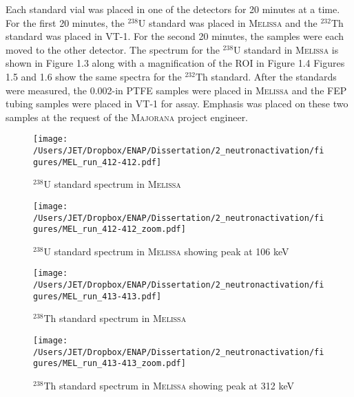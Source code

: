 Each standard vial was placed in one of the detectors for 20 minutes at a time.  For the first 20 minutes, the $^{238}$U standard was placed in \textsc{Melissa} and the $^{232}$Th standard was placed in VT-1.  For the second 20 minutes, the samples were each moved to the other detector.  The spectrum for the $^{238}$U standard in \textsc{Melissa} is shown in Figure 1.3 along with a magnification of the ROI in Figure 1.4  Figures 1.5 and 1.6 show the same spectra for the $^{232}$Th standard.  After the standards were measured, the 0.002-in PTFE samples were placed in \textsc{Melissa} and the FEP tubing samples were placed in VT-1 for assay.  Emphasis was placed on these two samples at the request of the \textsc{Majorana} project engineer.  

\begin{figure}[htbp]
\centering
\texttt{[image: /Users/JET/Dropbox/ENAP/Dissertation/2\_neutronactivation/figures/MEL\_run\_412-412.pdf]}
\caption[%
$^{238}$U standard spectrum in \textsc{Melissa}
]{%
$^{238}$U standard spectrum in \textsc{Melissa}
\label{fig:mjd_cryostat}} 
\end{figure}

\begin{figure}[htbp]
\centering
\texttt{[image: /Users/JET/Dropbox/ENAP/Dissertation/2\_neutronactivation/figures/MEL\_run\_412-412\_zoom.pdf]}
\caption[%
$^{238}$U standard spectrum in \textsc{Melissa} showing peak at 106 keV
]{%
$^{238}$U standard spectrum in \textsc{Melissa} showing peak at 106 keV
\label{fig:mjd_cryostat}} 
\end{figure}

\begin{figure}[htbp]
\centering
\texttt{[image: /Users/JET/Dropbox/ENAP/Dissertation/2\_neutronactivation/figures/MEL\_run\_413-413.pdf]}
\caption[%
$^{238}$Th standard spectrum in \textsc{Melissa}
]{%
$^{238}$Th standard spectrum in \textsc{Melissa}
\label{fig:mjd_cryostat}} 
\end{figure}

\begin{figure}[htbp]
\centering
\texttt{[image: /Users/JET/Dropbox/ENAP/Dissertation/2\_neutronactivation/figures/MEL\_run\_413-413\_zoom.pdf]}
\caption[%
$^{238}$Th standard spectrum in \textsc{Melissa} showing peak at 312 keV
]{%
$^{238}$Th standard spectrum in \textsc{Melissa} showing peak at 312 keV
\label{fig:mjd_cryostat}} 
\end{figure}


